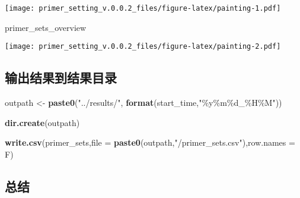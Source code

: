 \documentclass[
]{article}
\newenvironment{Shaded}{\begin{snugshade}}{\end{snugshade}}
\newcommand{\AttributeTok}[1]{\textcolor[rgb]{0.13,0.29,0.53}{#1}}
\newcommand{\DecValTok}[1]{\textcolor[rgb]{0.00,0.00,0.81}{#1}}
\newcommand{\FunctionTok}[1]{\textcolor[rgb]{0.13,0.29,0.53}{\textbf{#1}}}
\newcommand{\NormalTok}[1]{#1}
\newcommand{\OtherTok}[1]{\textcolor[rgb]{0.56,0.35,0.01}{#1}}
\newcommand{\SpecialCharTok}[1]{\textcolor[rgb]{0.81,0.36,0.00}{\textbf{#1}}}
\newcommand{\StringTok}[1]{\textcolor[rgb]{0.31,0.60,0.02}{#1}}
\begin{document}
\texttt{[image: primer\_setting\_v.0.0.2\_files/figure-latex/painting-1.pdf]}

\begin{Shaded}
\begin{Highlighting}[]
\NormalTok{primer\_sets\_overview}
\end{Highlighting}
\end{Shaded}

\texttt{[image: primer\_setting\_v.0.0.2\_files/figure-latex/painting-2.pdf]}

\hypertarget{ux8f93ux51faux7ed3ux679cux5230ux7ed3ux679cux76eeux5f55}{%
\subsection{输出结果到结果目录}\label{ux8f93ux51faux7ed3ux679cux5230ux7ed3ux679cux76eeux5f55}}

\begin{Shaded}
\begin{Highlighting}[]
\NormalTok{outpath }\OtherTok{\textless{}{-}} \FunctionTok{paste0}\NormalTok{(}\StringTok{"../results/"}\NormalTok{, }\FunctionTok{format}\NormalTok{(start\_time,}\StringTok{"\%y\%m\%d\_\%H\%M"}\NormalTok{))}

\FunctionTok{dir.create}\NormalTok{(outpath)}

\FunctionTok{write.csv}\NormalTok{(primer\_sets,}\AttributeTok{file =} \FunctionTok{paste0}\NormalTok{(outpath,}\StringTok{"/primer\_sets.csv"}\NormalTok{),}\AttributeTok{row.names =}\NormalTok{ F)}
\end{Highlighting}
\end{Shaded}

\hypertarget{ux603bux7ed3}{%
\subsection{总结}\label{ux603bux7ed3}}

\begin{Shaded}
\end{Shaded}
\end{document}
